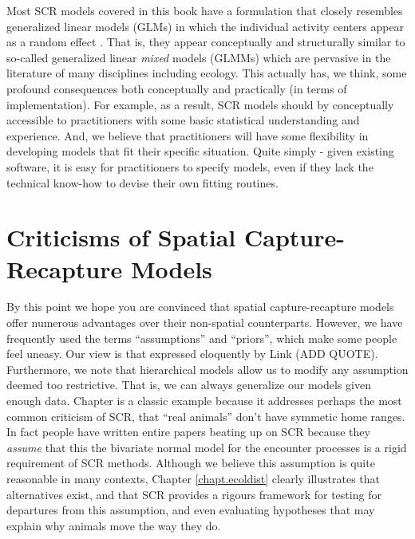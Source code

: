 Most SCR models covered in this book
have a formulation that closely resembles generalized linear
models (GLMs) in which the individual activity centers appear as a
random effect \citep{royle_etal:2009ecol, royle_gardner:2011}. That is,
they appear conceptually and structurally similar to so-called
generalized linear {\it mixed} models (GLMMs) which are pervasive in
the literature of many disciplines including ecology.  This actually
has, we think, some profound consequences both conceptually and
practically (in terms of implementation). For example, as a result,
SCR models should by conceptually accessible to practitioners with
some basic statistical understanding and experience.  And, we believe
that practitioners will have some flexibility in developing models
that fit their specific situation. Quite simply - given existing
software, it is easy for practitioners to specify models, even if they
lack the technical know-how to devise their own fitting routines.







\section{Criticisms of Spatial Capture-Recapture Models}

By this point we hope you are convinced that spatial capture-recapture models
offer numerous advantages over their non-spatial
counterparts. However, we have frequently used the terms
``assumptions'' and ``priors'', which make some people feel
uneasy. Our view is that expressed eloquently by Link (ADD
QUOTE). Furthermore, we note that hierarchical models allow us to
modify any assumption deemed too
restrictive. That is, we can always generalize our models given enough
data. Chapter is a classic example because it addresses
perhaps the most common criticism of SCR, that ``real animals'' don't
have symmetic home ranges. In fact people have written entire papers
beating up on SCR because they \emph{assume} that this the bivariate
normal model for the encounter processes is a rigid requirement of SCR
methods. Although we believe this assumption is quite reasonable in
many contexts, Chapter \ref{chapt.ecoldist} clearly illustrates that
alternatives exist, and that SCR provides a rigours framework for
testing for departures from this assumption, and even evaluating
hypotheses that may explain why animals move the way they do.



